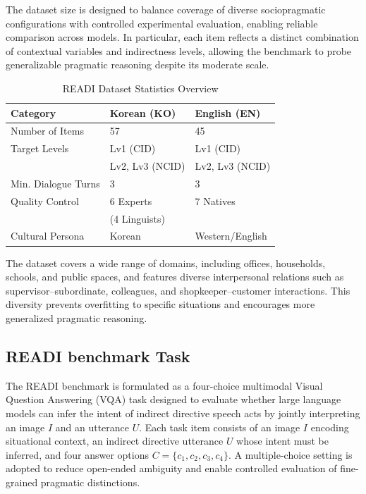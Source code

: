 \documentclass[11pt]{article}
\begin{document}
The dataset size is designed to balance coverage of diverse sociopragmatic configurations with controlled experimental evaluation, enabling reliable comparison across models. In particular, each item reflects a distinct combination of contextual variables and indirectness levels, allowing the benchmark to probe generalizable pragmatic reasoning despite its moderate scale.

\begin{table}[t]
\centering
\small
\setlength{\tabcolsep}{3pt}

\begin{tabular}{l p{1.8cm} p{1.8cm}}
\toprule
\textbf{Category} & \textbf{Korean (KO)} & \textbf{English (EN)} \\
\midrule
Number of Items & 57 & 45 \\
\midrule
Target Levels 
& Lv1 (CID) & Lv1 (CID) \\
& Lv2, Lv3 (NCID) & Lv2, Lv3 (NCID) \\
\midrule
Min. Dialogue Turns & 3 & 3 \\
\midrule
Quality Control 
& 6 Experts & 7 Natives \\
& (4 Linguists) & \\
\midrule
Cultural Persona & Korean & Western/English \\
\bottomrule
\end{tabular}

\caption{READI Dataset Statistics Overview}
\label{tab:dataset_stats}

\end{table}

The dataset covers a wide range of domains, including offices, households, schools, and public spaces, and features diverse interpersonal relations such as supervisor–subordinate, colleagues, and shopkeeper–customer interactions. This diversity prevents overfitting to specific situations and encourages more generalized pragmatic reasoning.

\subsection{READI benchmark Task}
The READI benchmark is formulated as a four-choice multimodal Visual Question Answering (VQA) task designed to evaluate whether large language models can infer the intent of indirect directive speech acts by jointly interpreting an image $I$ and an utterance $U$. Each task item consists of an image $I$ encoding situational context, an indirect directive utterance $U$ whose intent must be inferred, and four answer options $C = \{c_1, c_2, c_3, c_4\}$. A multiple-choice setting is adopted to reduce open-ended ambiguity and enable controlled evaluation of fine-grained pragmatic distinctions.
\end{document}

